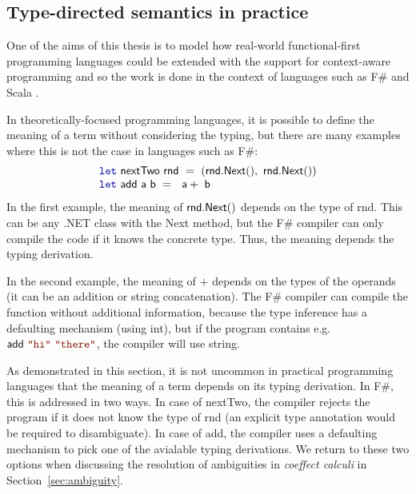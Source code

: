 \documentclass[
		twoside,openright,titlepage,numbers=noenddot,headinclude,%
                footinclude=true,cleardoublepage=empty,
                BCOR=10mm,paper=a4,fontsize=10pt, %
                ngerman,american, %
                ]{scrreprt}
\newcommand{\kvd}[1]{\textnormal{\textcolor{kvdclr}{\ttfamily #1}}}
\newcommand{\str}[1]{\textnormal{\textcolor{strclr}{\ttfamily "#1"}}}
\newcommand{\ident}[1]{\textnormal{\sffamily #1}}
\begin{document}
\subsection{Type-directed semantics in practice}
\label{sec:background-practice}

One of the aims of this thesis is to model how real-world functional-first programming languages
could be extended with the support for context-aware programming and so the work is done in
the context of languages such as F\# \cite{app-fsharp-spec} and Scala \cite{app-scala-spec}.

In theoretically-focused programming languages, it is possible to define the meaning of a term
without considering the typing, but there are many examples where this is not the case in languages
such as F\#:
%
\begin{equation*}
\begin{array}{l}
  \kvd{let}~\ident{nextTwo}~\ident{rnd}~=~(\ident{rnd.Next}(), \ident{rnd.Next}()) \\
  \kvd{let}~\ident{add}~\ident{a}~\ident{b}~=~\ident{a}+\ident{b}
\end{array}
\end{equation*}
%
In the first example, the meaning of $\ident{rnd.Next}()$ depends on the type of \ident{rnd}.
This can be any .NET class with the \ident{Next} method, but the F\# compiler can only compile
the code if it knows the concrete type. Thus, the meaning depends the typing derivation.

In the second example, the meaning of $+$ depends on the types of the operands (it can be an
addition or string concatenation). The F\# compiler can compile the function
without additional information, because the type inference has a defaulting mechanism (using
\ident{int}), but if the program contains e.g.~$\ident{add}~\str{hi}~\str{there}$, the compiler
will use \ident{string}.

As demonstrated in this section, it is not uncommon in practical programming languages that the
meaning of a term depends on its typing derivation. In F\#, this is addressed in two ways. In case
of \ident{nextTwo}, the compiler rejects the program if it does not know the type of \ident{rnd}
(an explicit type annotation would be required to disambiguate). In case of \ident{add}, the
compiler uses a defaulting mechanism to pick one of the avialable typing derivations. We return to
these two options when discussing the resolution of ambiguities in \emph{coeffect calculi} in
Section~\ref{sec:ambiguity}.
\end{document}
